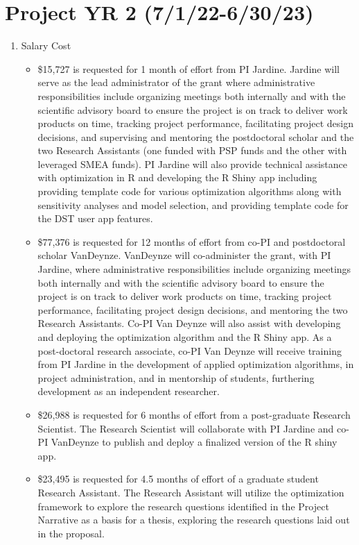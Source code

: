 \section{Project YR 2 (7/1/22-6/30/23)}
\begin{enumerate}
\item Salary Cost
\begin{itemize}
\item  \$15,727 is requested for 1 month of effort from PI Jardine. Jardine will serve as the lead administrator of the grant where administrative responsibilities include organizing meetings both internally and with the scientific advisory board to ensure the project is on track to deliver work products on time, tracking project performance, facilitating project design decisions, and supervising and mentoring the postdoctoral scholar and the two Research Assistants (one funded with PSP funds and the other with leveraged SMEA funds). PI Jardine will also provide technical assistance with optimization in R and developing the R Shiny app including providing template code for various optimization algorithms along with sensitivity analyses and model selection, and providing template code for the DST user app features.
\item \$77,376 is requested for 12 months of effort from co-PI and postdoctoral scholar VanDeynze. VanDeynze will co-administer the grant, with PI Jardine, where administrative responsibilities include organizing meetings both internally and with the scientific advisory board to ensure the project is on track to deliver work products on time, tracking project performance, facilitating project design decisions, and mentoring the two Research Assistants. Co-PI Van Deynze will also assist with developing and deploying the optimization algorithm and the R Shiny app. As a post-doctoral research associate, co-PI Van Deynze will receive training from PI Jardine in the development of applied optimization algorithms, in project administration, and in mentorship of students, furthering development as an independent researcher. 
\item \$26,988 is requested for 6 months of effort from a post-graduate Research Scientist. The Research Scientist will collaborate with PI Jardine and co-PI VanDeynze to publish and deploy a finalized version of the R shiny app.
\item \$23,495 is requested for 4.5 months of effort of a graduate student Research Assistant. The Research Assistant will utilize the optimization framework to explore the research questions identified in the Project Narrative as a basis for a thesis, exploring the research questions laid out in the proposal.

\end{itemize}
\end{enumerate}
